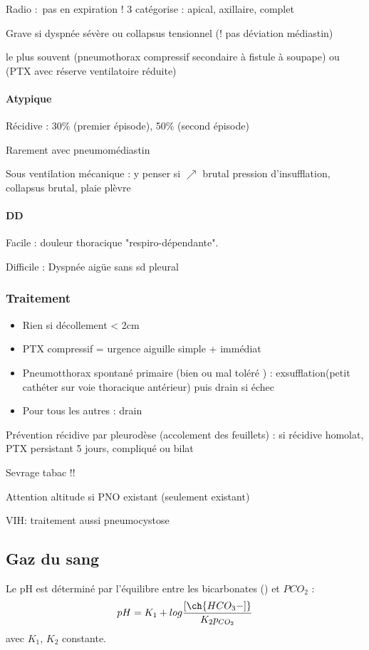 \documentclass[11pt]{article}
\begin{document}
Radio : pas en expiration ! 3 catégorise : apical, axillaire, complet

Grave si dyspnée sévère ou collapsus tensionnel (! pas déviation médiastin) 

\thus le plus souvent (pneumothorax compressif secondaire à fistule à
soupape) ou (PTX avec réserve ventilatoire réduite)

\paragraph{Atypique}
\label{sec:orgccac3d6}
Récidive : 30\% (premier épisode), 50\% (second épisode)

Rarement avec pneumomédiastin

Sous ventilation mécanique : y penser si \(\nearrow\) brutal pression
d'insufflation, collapsus brutal, plaie plèvre

\paragraph{DD}
\label{sec:org4b8ac21}
Facile : douleur thoracique "respiro-dépendante".

Difficile : Dyspnée aigüe sans sd pleural 

\subsubsection{Traitement}
\label{sec:orgf586af2}

\begin{itemize}
\item Rien si décollement < 2cm
\item PTX compressif = urgence \thus aiguille simple + immédiat
\item Pneumotthorax spontané primaire (bien ou mal toléré ) :
exsufflation(petit cathéter sur voie thoracique antérieur) puis drain
si échec
\item Pour tous les autres : drain
\end{itemize}


Prévention récidive par pleurodèse (accolement des feuillets) : si récidive
homolat, PTX persistant 5 jours, compliqué ou bilat

Sevrage tabac !!

Attention altitude si PNO existant (seulement existant)

VIH: traitement aussi pneumocystose


\subsection{Gaz du sang}
\label{sec:org7895011}
\label{appendix:gds}
Le pH est déterminé par l'équilibre entre les bicarbonates () et
\(PCO_2\) :
\begin{equation}
  pH = K_1 + log\frac{[\ch{HCO_3-]}}{K_2 p_{CO_2}}
\end{equation}
avec \(K_1\), \(K_2\) constante.
\end{document}
